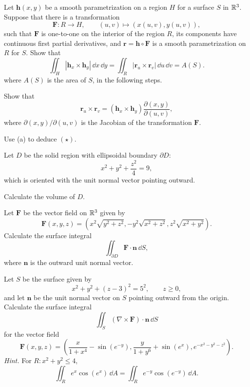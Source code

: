 \begin{problem}
Let $\mathbf h(x,y)$ be a smooth parametrization on a region $H$ for a surface $S$ in $\mathbb{R}^3$. Suppose that there is a transformation
\[
\mathbf F\colon R\to H,
\qquad
(u,v)\mapsto(x(u,v),y(u,v)),
\]
such that $\mathbf F$ is one-to-one on the interior of the region $R$, its components have continuous first partial derivatives, and $\mathbf r=\mathbf h\circ\mathbf F$ is a smooth parametrization on $R$ for $S$. Show that
\[
\iint_H |\mathbf h_x\times\mathbf h_y|\,\dd x\,\dd y
=
\iint_R |\mathbf r_u\times\mathbf r_v|\,\dd u\,\dd v
=A(S).
\tag{\(\star\)}
\]
where $A(S)$ is the area of $S$, in the following steps.
\begin{problemsubparts}
\item Show that
\[
\mathbf r_u\times\mathbf r_v
=
(\mathbf h_x\times\mathbf h_y)
\frac{\partial(x,y)}{\partial(u,v)},
\]
where $\partial(x,y)/\partial(u,v)$ is the Jacobian of the transformation $\mathbf F$.
\item Use (a) to deduce $(\star)$.
\end{problemsubparts}
\end{problem}

\begin{problem}
Let $D$ be the solid region with ellipsoidal boundary $\partial D$:
\[
x^2+y^2+\frac{z^2}{4}=9,
\]
which is oriented with the unit normal vector pointing outward.
\begin{problemsubparts}
\item Calculate the volume of $D$.
\item Let $\mathbf F$ be the vector field on $\mathbb{R}^3$ given by
\[
\mathbf F(x,y,z)=
\left(
x^2\sqrt{y^2+z^2},
-y^2\sqrt{x^2+z^2},
z^2\sqrt{x^2+y^2}
\right).
\]
Calculate the surface integral
\[
\iint_{\partial D}\mathbf F\cdot\mathbf n\,\dd S,
\]
where $\mathbf n$ is the outward unit normal vector.
\end{problemsubparts}
\end{problem}

\begin{problem}
Let $S$ be the surface given by
\[
x^2+y^2+(z-3)^2=5^2,
\qquad
z\ge0,
\]
and let $\mathbf n$ be the unit normal vector on $S$ pointing outward from the origin. Calculate the surface integral
\[
\iint_S (\nabla\times\mathbf F)\cdot\mathbf n\,\dd S
\]
for the vector field
\[
\mathbf F(x,y,z)=
\left(
\frac{x}{1+x^4}-\sin(e^{-y}),
\frac{y}{1+y^6}+\sin(e^x),
e^{-x^2-y^2-z^2}
\right).
\]
\textit{Hint.} For $R\colon x^2+y^2\le4$,
\[
\iint_R e^x\cos(e^x)\,\dd A
=
\iint_R e^{-y}\cos(e^{-y})\,\dd A.
\]
\end{problem}


